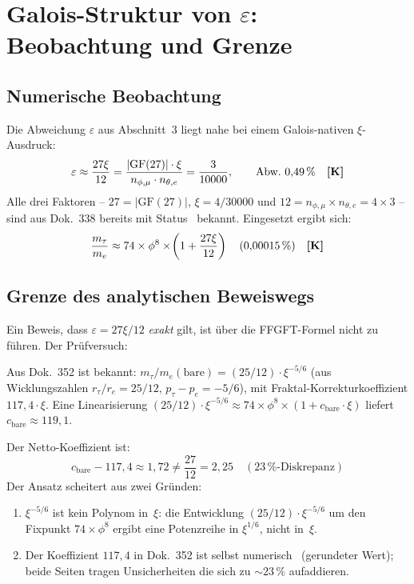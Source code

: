 \section{Galois-Struktur von $\varepsilon$: Beobachtung und Grenze}

\subsection{Numerische Beobachtung}

Die Abweichung $\varepsilon$ aus Abschnitt~3 liegt nahe bei einem
Galois-nativen $\xi$-Ausdruck:
\begin{equation}\label{eq:eps_galois}
  \varepsilon \approx \frac{27\xi}{12}
  = \frac{|\text{GF}(27)|\cdot\xi}{n_{\phi,\mu}\cdot n_{\theta,e}}
  = \frac{3}{10000}, \qquad \text{Abw.\ } 0{,}49\,\% \quad \textbf{[K]}
\end{equation}
Alle drei Faktoren -- $27 = |\text{GF}(27)|$, $\xi = 4/30000$ und
$12 = n_{\phi,\mu}\times n_{\theta,e} = 4\times3$ -- sind aus Dok.~338
bereits mit Status \BM\ bekannt. Eingesetzt ergibt sich:
\begin{equation}
  \frac{m_\tau}{m_e} \approx 74\times\phi^8\times\!\left(1+\frac{27\xi}{12}\right)
  \quad (0{,}00015\,\%) \quad \textbf{[K]}
\end{equation}

\subsection{Grenze des analytischen Beweiswegs}

Ein Beweis, dass $\varepsilon = 27\xi/12$ \emph{exakt} gilt, ist über die FFGFT-Formel
nicht zu führen. Der Prüfversuch:

Aus Dok.~352 ist bekannt: $m_\tau/m_e(\text{bare}) = (25/12)\cdot\xi^{-5/6}$
(aus Wicklungszahlen $r_\tau/r_e = 25/12$, $p_\tau-p_e=-5/6$), mit
Fraktal-Korrekturkoeffizient $117{,}4\cdot\xi$. Eine Linearisierung
$(25/12)\cdot\xi^{-5/6} \approx 74\times\phi^8\times(1+c_\text{bare}\cdot\xi)$
liefert $c_\text{bare} \approx 119{,}1$.

Der Netto-Koeffizient ist:
\[
  c_\text{bare} - 117{,}4 \approx 1{,}72 \neq \frac{27}{12} = 2{,}25
  \quad (23\,\%\text{-Diskrepanz})
\]
Der Ansatz scheitert aus zwei Gründen:
\begin{enumerate}
  \item $\xi^{-5/6}$ ist kein Polynom in~$\xi$: die Entwicklung
    $(25/12)\cdot\xi^{-5/6}$ um den Fixpunkt $74\times\phi^8$ ergibt
    eine Potenzreihe in $\xi^{1/6}$, nicht in~$\xi$.
  \item Der Koeffizient $117{,}4$ in Dok.~352 ist selbst numerisch \KM\
    (gerundeter Wert); beide Seiten tragen Unsicherheiten die sich zu
    $\sim23\,\%$ aufaddieren.
\end{enumerate}

